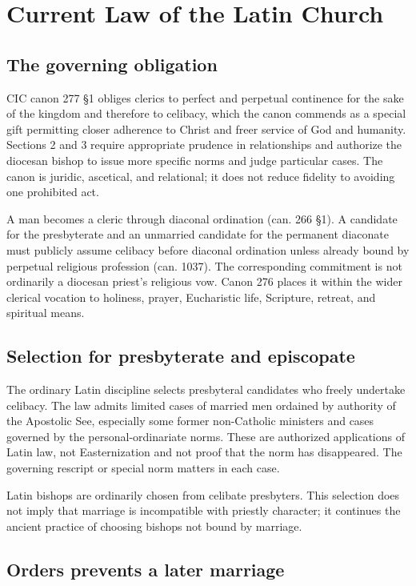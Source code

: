 \section{Current Law of the Latin Church}

\subsection{The governing obligation}

CIC canon 277 \S1 obliges clerics to perfect and perpetual continence for the sake of the kingdom and therefore to celibacy, which the canon commends as a special gift permitting closer adherence to Christ and freer service of God and humanity. Sections 2 and 3 require appropriate prudence in relationships and authorize the diocesan bishop to issue more specific norms and judge particular cases. The canon is juridic, ascetical, and relational; it does not reduce fidelity to avoiding one prohibited act.

A man becomes a cleric through diaconal ordination (can. 266 \S1). A candidate for the presbyterate and an unmarried candidate for the permanent diaconate must publicly assume celibacy before diaconal ordination unless already bound by perpetual religious profession (can. 1037). The corresponding commitment is not ordinarily a diocesan priest's religious vow. Canon 276 places it within the wider clerical vocation to holiness, prayer, Eucharistic life, Scripture, retreat, and spiritual means.

\subsection{Selection for presbyterate and episcopate}

The ordinary Latin discipline selects presbyteral candidates who freely undertake celibacy. The law admits limited cases of married men ordained by authority of the Apostolic See, especially some former non-Catholic ministers and cases governed by the personal-ordinariate norms. These are authorized applications of Latin law, not Easternization and not proof that the norm has disappeared. The governing rescript or special norm matters in each case.

Latin bishops are ordinarily chosen from celibate presbyters. This selection does not imply that marriage is incompatible with priestly character; it continues the ancient practice of choosing bishops not bound by marriage.

\subsection{Orders prevents a later marriage}

